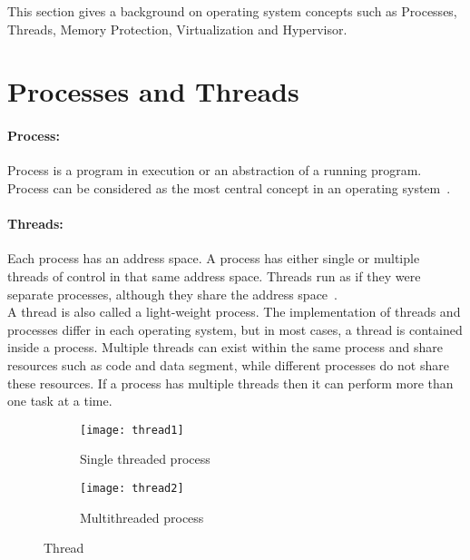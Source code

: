 This section gives a background on operating system concepts such as Processes, Threads, Memory Protection, Virtualization and Hypervisor.
\section{Processes and Threads}
\paragraph{Process:} Process is a program in execution or an abstraction of a running program. Process can be considered as the most central concept in an operating system~\cite{Galvin}.

\paragraph{Threads:} Each process has an address space. A process has either single or multiple threads of control in that same address space. Threads run as if they were separate processes, although they share the address space~\cite{Galvin}.
\\
A thread is also called a light-weight process. The implementation of threads and processes differ in each operating system, but in most cases, a thread is contained inside a process. Multiple threads can exist within the same process and share resources such as code and data segment, while different processes do not share these resources. If a process has multiple threads then it can perform more than one task at a time.
\begin{figure}[!ht]
    \centering
    \begin{subfigure}[b]{0.45\textwidth}
	\texttt{[image: thread1]}
	\caption{Single threaded process}
	\label{fig:thread1}
    \end{subfigure}
	\hfill
    \begin{subfigure}[b]{0.45\textwidth}
	\texttt{[image: thread2]}
	\caption{Multithreaded process}
	\label{fig:thread2}
    \end{subfigure}
    \caption{Thread}\label{fig:threads}
\end{figure}

